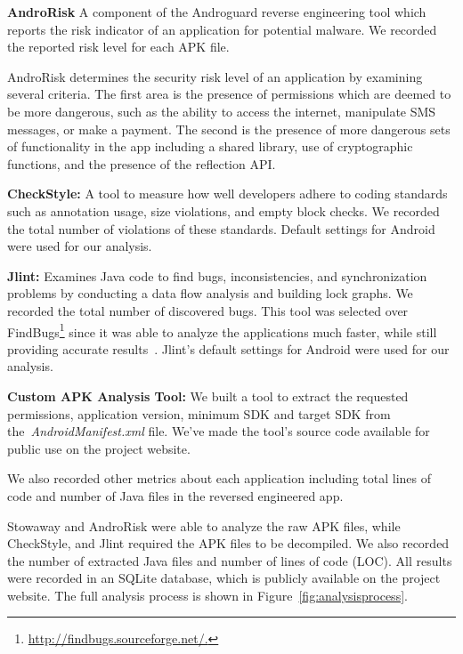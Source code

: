 \documentclass{sig-alternate}
\newcommand{\todo}[1]{\textcolor{cyan}{\textbf{[#1]}}}
\begin{document}
 \textbf{AndroRisk} A component of the Androguard reverse engineering tool which reports the risk indicator of an application for potential malware. We recorded the reported risk level for each APK file.

AndroRisk determines the security risk level of an application by examining several criteria. The first area is the presence of permissions which are deemed to be more dangerous, such as the ability to access the internet, manipulate SMS messages, or make a payment. The second is the presence of more dangerous sets of functionality in the app including a shared library, use of cryptographic functions, and the presence of the reflection API.

 \textbf{CheckStyle:} A tool to measure how well developers adhere to coding standards such as annotation usage, size violations, and empty block checks. We recorded the total number of violations of these standards. Default settings for Android were used for our analysis.

 \textbf{Jlint:} Examines Java code to find bugs, inconsistencies, and synchronization problems by conducting a data flow analysis and building lock graphs. We recorded the total number of discovered bugs. This tool was selected over FindBugs\footnote{\url{http://findbugs.sourceforge.net/.}} since it was able to analyze the applications much faster, while still providing accurate results~\cite{rutar2004comparison}. Jlint's default settings for Android were used for our analysis.



\textbf{Custom APK Analysis Tool:} We built a tool to extract the requested permissions, application version, minimum SDK and target SDK from the~\emph{AndroidManifest.xml} file. We've made the tool's source code available for public use on the project website.

We also recorded other metrics about each application including total lines of code and number of Java files in the reversed engineered app.






Stowaway and AndroRisk were able to analyze the raw APK files, while CheckStyle, and Jlint required the APK files to be decompiled. We also recorded the number of extracted Java files and number of lines of code (LOC). All results were recorded in an SQLite database, which is publicly available on the project website. The full analysis process is shown in Figure~\ref{fig:analysisprocess}.
\end{document}
